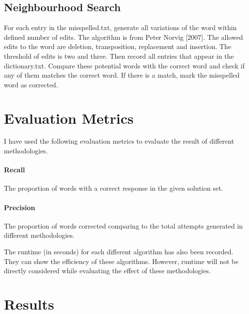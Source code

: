 \documentclass[11pt]{article}
\begin{document}
  \subsection{Neighbourhood Search}
  For each entry in the misspelled.txt, generate all variations of the word
  within defined number of edits.
  The algorithm is from Peter Norvig [2007].
  The allowed edits to the word are deletion, transposition, replacement and insertion.
  The threshold of edits is two and three. Then record all entries that
  appear in the dictionary.txt. Compare these potential words with the correct word
  and check if any of them matches the correct word. If there is a match, mark
  the misspelled word as corrected.

\section{Evaluation Metrics}
I have used the following evaluation metrics to evaluate the result of different
methodologies.

  \paragraph{Recall} The proportion of words with a correct response in the given
  solution set.

  \paragraph{Precision} The proportion of words corrected comparing
  to the total attempts generated in different methodologies.

  The runtime (in seconds) for each different algorithm has also been recorded.
  They can show the efficiency of these algorithms. However, runtime will not be
  directly considered while evaluating the effect of these methodologies.

\section{Results}
\end{document}
